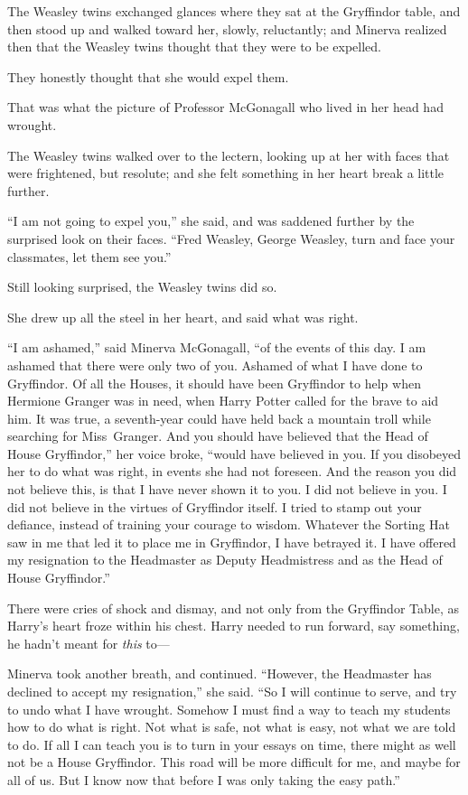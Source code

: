 The Weasley twins exchanged glances where they sat at the Gryffindor table, and then stood up and walked toward her, slowly, reluctantly; and Minerva realized then that the Weasley twins thought that they were to be expelled.

They honestly thought that she would expel them.

That was what the picture of Professor McGonagall who lived in her head had wrought.

The Weasley twins walked over to the lectern, looking up at her with faces that were frightened, but resolute; and she felt something in her heart break a little further.

“I am not going to expel you,” she said, and was saddened further by the surprised look on their faces.
“Fred Weasley, George Weasley, turn and face your classmates, let them see you.”

Still looking surprised, the Weasley twins did so.

She drew up all the steel in her heart, and said what was right.

“I am ashamed,” said Minerva McGonagall, “of the events of this day. I am ashamed that there were only two of you. Ashamed of what I have done to Gryffindor. Of all the Houses, it should have been Gryffindor to help when Hermione Granger was in need, when Harry Potter called for the brave to aid him. It was true, a seventh-year could have held back a mountain troll while searching for Miss~Granger. And you should have believed that the Head of House Gryffindor,” her voice broke, “would have believed in you. If you disobeyed her to do what was right, in events she had not foreseen. And the reason you did not believe this, is that I have never shown it to you. I did not believe in you. I did not believe in the virtues of Gryffindor itself. I tried to stamp out your defiance, instead of training your courage to wisdom. Whatever the Sorting Hat saw in me that led it to place me in Gryffindor, I have betrayed it. I have offered my resignation to the Headmaster as Deputy Headmistress and as the Head of House Gryffindor.”

\later

There were cries of shock and dismay, and not only from the Gryffindor Table, as Harry’s heart froze within his chest. Harry needed to run forward, say something, he hadn’t meant for \emph{this} to—

\later

Minerva took another breath, and continued.
“However, the Headmaster has declined to accept my resignation,” she said.
“So I will continue to serve, and try to undo what I have wrought. Somehow I must find a way to teach my students how to do what is right. Not what is safe, not what is easy, not what we are told to do. If all I can teach you is to turn in your essays on time, there might as well not be a House Gryffindor. This road will be more difficult for me, and maybe for all of us. But I know now that before I was only taking the easy path.”

